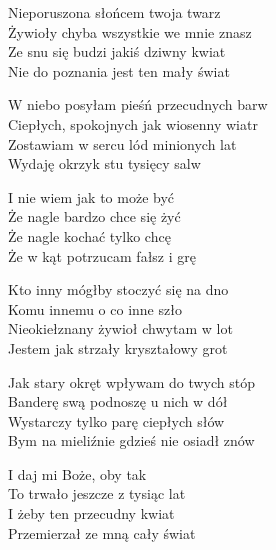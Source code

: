 \begin{text}
    Nieporuszona słońcem twoja twarz\\
    Żywioły chyba wszystkie we mnie znasz\\
    Ze snu się budzi jakiś dziwny kwiat\\
    Nie do poznania jest ten mały świat

    W niebo posyłam pieśń przecudnych barw\\
    Ciepłych, spokojnych jak wiosenny wiatr\\
    Zostawiam w sercu lód minionych lat\\
    Wydaję okrzyk stu tysięcy salw

    \vin I nie wiem jak to może być\\
    \vin Że nagle bardzo chce się żyć\\
    \vin Że nagle kochać tylko chcę\\
    \vin Że w kąt potrzucam fałsz i grę

    Kto inny mógłby stoczyć się na dno\\
    Komu innemu o co inne szło\\
    Nieokiełznany żywioł chwytam w lot\\
    Jestem jak strzały kryształowy grot

    Jak stary okręt wpływam do twych stóp\\
    Banderę swą podnoszę u nich w dół\\
    Wystarczy tylko parę ciepłych słów\\
    Bym na mieliźnie gdzieś nie osiadł znów

    \vin I daj mi Boże, oby tak\\
    \vin To trwało jeszcze z tysiąc lat\\
    \vin I żeby ten przecudny kwiat\\
    \vin Przemierzał ze mną cały świat
\end{text}
\begin{chord}

\end{chord}
